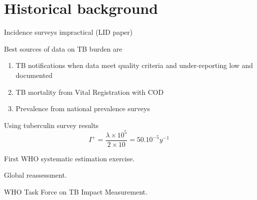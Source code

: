 \section{Historical background}

Incidence surveys impractical\cite{18201929} (LID paper)

Best sources of data on TB burden are 
\begin{enumerate}
\item TB notifications when data meet quality criteria and under-reporting low and documented
\item TB mortality from Vital Registration with COD
\item Prevalence from national prevalence surveys
\end{enumerate}

Using tuberculin survey results\cite{Styblo1985}
$$I^+ = \frac{\lambda \times 10^5}{2 \times 10} = 50.10^{-5} y^{-1}$$

First WHO systematic estimation exercise\cite{1600578}.

Global reassessment\cite{10517722}.

WHO Task Force on TB Impact Measurement.



  
  
  
  
  
  
  
  